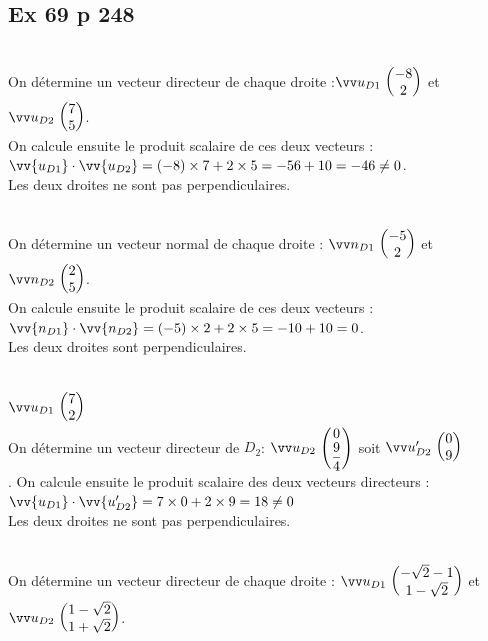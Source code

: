 \documentclass[12pt,a4paper]{book}
\begin{document}
\subsection*{Ex 69 p 248}
\begin{enumMet}
    \item {}\\
On détermine un vecteur directeur de chaque droite :$\Coord{u_{D1}}{-8}{2}$    et $\Coord{u_{D2}}{7}{5}$.\\
On calcule ensuite le produit scalaire de ces deux vecteurs :\\
$\vv{u_{D 1}} \cdot \vv{u_{D 2}}=(-8) \times 7+2 \times 5=-56+10=-46 \neq 0$.\\
Les deux droites ne sont pas perpendiculaires.
    \item {}\\
On détermine un vecteur normal de chaque droite : $\Coord{n_{D1}}{-5}{2}$ et $\Coord{n_{D2}}{2}{5}$.\\
On calcule ensuite le produit scalaire de ces deux vecteurs :\\
$\vv{n_{D 1}} \cdot \vv{n_{D 2}}=(-5) \times 2+2 \times 5=-10+10=0$.\\
Les deux droites sont perpendiculaires.
\item {}\\
$\Coord{u_{D1}}{7}{2}$\\
On détermine un vecteur directeur de $D_{2}$: $\Coord{u_{D2}}{0}{\dfrac{9}{4}}$ soit $\Coord{u'_{D2}}{0}{9}$\\.
On calcule ensuite le produit scalaire des deux vecteurs directeurs :\\
$\vv{u_{D1}} \cdot \vv{u'_{D 2}}=7 \times 0+2 \times 9=18 \neq 0$\\
Les deux droites ne sont pas perpendiculaires.
    \item {}\\
On détermine un vecteur directeur de chaque droite : $\Coord{u_{D1}}{-\sqrt{2}-1}{1-\sqrt{2}}$ et $\Coord{u_{D2}}{1-\sqrt{2}}{1+\sqrt{2}}$.\\

\end{enumMet}
\end{document}
